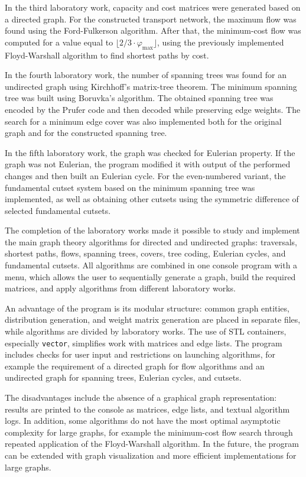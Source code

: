 \documentclass[a4paper,final]{article}
\begin{document}
In the third laboratory work, capacity and cost matrices were generated based on a directed graph. For the constructed transport network, the maximum flow was found using the Ford-Fulkerson algorithm. After that, the minimum-cost flow was computed for a value equal to $\lfloor 2/3 \cdot \varphi_{\max} \rfloor$, using the previously implemented Floyd-Warshall algorithm to find shortest paths by cost.

In the fourth laboratory work, the number of spanning trees was found for an undirected graph using Kirchhoff's matrix-tree theorem. The minimum spanning tree was built using Boruvka's algorithm. The obtained spanning tree was encoded by the Prufer code and then decoded while preserving edge weights. The search for a minimum edge cover was also implemented both for the original graph and for the constructed spanning tree.

In the fifth laboratory work, the graph was checked for Eulerian property. If the graph was not Eulerian, the program modified it with output of the performed changes and then built an Eulerian cycle. For the even-numbered variant, the fundamental cutset system based on the minimum spanning tree was implemented, as well as obtaining other cutsets using the symmetric difference of selected fundamental cutsets.

The completion of the laboratory works made it possible to study and implement the main graph theory algorithms for directed and undirected graphs: traversals, shortest paths, flows, spanning trees, covers, tree coding, Eulerian cycles, and fundamental cutsets. All algorithms are combined in one console program with a menu, which allows the user to sequentially generate a graph, build the required matrices, and apply algorithms from different laboratory works.

An advantage of the program is its modular structure: common graph entities, distribution generation, and weight matrix generation are placed in separate files, while algorithms are divided by laboratory works. The use of STL containers, especially \texttt{vector}, simplifies work with matrices and edge lists. The program includes checks for user input and restrictions on launching algorithms, for example the requirement of a directed graph for flow algorithms and an undirected graph for spanning trees, Eulerian cycles, and cutsets.

The disadvantages include the absence of a graphical graph representation: results are printed to the console as matrices, edge lists, and textual algorithm logs. In addition, some algorithms do not have the most optimal asymptotic complexity for large graphs, for example the minimum-cost flow search through repeated application of the Floyd-Warshall algorithm. In the future, the program can be extended with graph visualization and more efficient implementations for large graphs.
\end{document}

